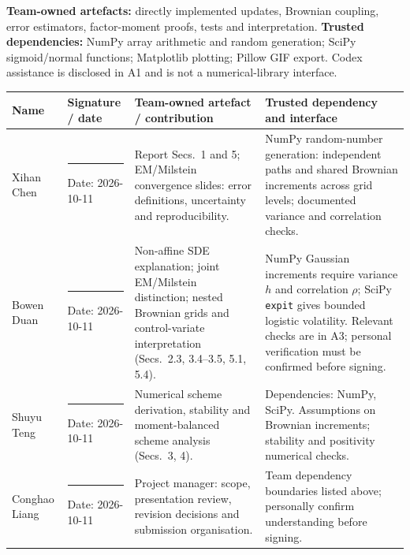 \textbf{Team-owned artefacts:} directly implemented updates, Brownian coupling, error estimators, factor-moment proofs, tests and interpretation. \textbf{Trusted dependencies:} NumPy array arithmetic and random generation; SciPy sigmoid/normal functions; Matplotlib plotting; Pillow GIF export. Codex assistance is disclosed in A1 and is not a numerical-library interface.
\begingroup\small\setlength{\tabcolsep}{4pt}
\begin{longtable}{@{}p{.18\linewidth}p{.17\linewidth}p{.32\linewidth}p{.27\linewidth}@{}}\toprule
Name & Signature / date & Team-owned artefact / contribution & Trusted dependency and interface\\\midrule\endhead
Xihan Chen\newline 2360253 & \rule{.9\linewidth}{.3pt}\newline Date: 2026-10-11 & Report Secs.~1 and 5; EM/Milstein convergence slides: error definitions, uncertainty and reproducibility. & NumPy random-number generation: independent paths and shared Brownian increments across grid levels; documented variance and correlation checks.\\[18pt]
Bowen Duan\newline 2362211 & \rule{.9\linewidth}{.3pt}\newline Date: 2026-10-11 & Non-affine SDE explanation; joint EM/Milstein distinction; nested Brownian grids and control-variate interpretation (Secs.~2.3, 3.4--3.5, 5.1, 5.4). & NumPy Gaussian increments require variance $h$ and correlation $\rho$; SciPy \texttt{expit} gives bounded logistic volatility. Relevant checks are in A3; personal verification must be confirmed before signing.\\[18pt]
Shuyu Teng\newline 2362204 & \rule{.9\linewidth}{.3pt}\newline Date: 2026-10-11 & Numerical scheme derivation, stability and moment-balanced scheme analysis (Secs.~3, 4). & Dependencies: NumPy, SciPy. Assumptions on Brownian increments; stability and positivity numerical checks.\\[18pt]
Conghao Liang\newline 2362212 & \rule{.9\linewidth}{.3pt}\newline Date: 2026-10-11 & Project manager: scope, presentation review, revision decisions and submission organisation. & Team dependency boundaries listed above; personally confirm understanding before signing.\\[18pt]\bottomrule
\end{longtable}\endgroup

